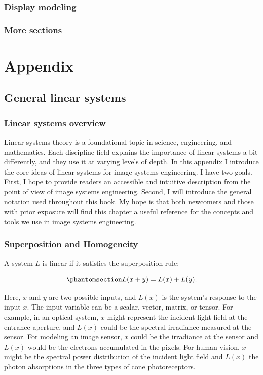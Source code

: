 \documentclass[
  letterpaper,
]{book}
\begin{document}
\section{Display modeling}\label{display-modeling}

\section{More sections}\label{more-sections}

\part{Appendix}

\chapter{General linear systems}\label{sec-appendix-linear-systems}

\section{Linear systems overview}\label{linear-systems-overview}

Linear systems theory is a foundational topic in science, engineering,
and mathematics. Each discipline field explains the importance of linear
systems a bit differently, and they use it at varying levels of depth.
In this appendix I introduce the core ideas of linear systems for image
systems engineering. I have two goals. First, I hope to provide readers
an accessible and intuitive description from the point of view of image
systems engineering. Second, I will introduce the general notation used
throughout this book. My hope is that both newcomers and those with
prior exposure will find this chapter a useful reference for the
concepts and tools we use in image systems engineering.

\section{Superposition and Homogeneity}\label{sec-ls-superposition}

A system \(L\) is linear if it satisfies the superposition rule:

\begin{equation}\phantomsection\label{eq-superposition}{
L(x + y) = L(x) + L(y).
}\end{equation}

Here, \(x\) and \(y\) are two possible inputs, and \(L(x)\) is the
system's response to the input \(x\). The input variable can be a
scalar, vector, matrix, or tensor. For example, in an optical system,
\(x\) might represent the incident light field at the entrance aperture,
and \(L(x)\) could be the spectral irradiance measured at the sensor.
For modeling an image sensor, \(x\) could be the irradiance at the
sensor and \(L(x)\) would be the electrons accumulated in the pixels.
For human vision, \(x\) might be the spectral power distribution of the
incident light field and \(L(x)\) the photon absorptions in the three
types of cone photoreceptors.
\end{document}
